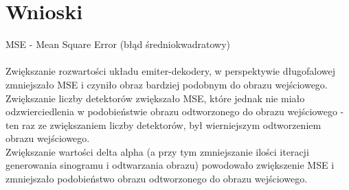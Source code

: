 \documentclass[a4paper,11pt]{article}
\begin{document}
\section{Wnioski}
MSE - Mean Square Error (błąd średniokwadratowy)\\\\
Zwiększanie rozwartości układu emiter-dekodery, w perspektywie długofalowej zmniejszało MSE i czyniło obraz bardziej podobnym do obrazu wejściowego.\\
Zwiększanie liczby detektorów zwiększało MSE, które jednak nie miało odzwierciedlenia w podobieństwie obrazu odtworzonego do obrazu wejściowego - ten raz ze zwiększaniem liczby detektorów, był wierniejszym odtworzeniem obrazu wejściowego.\\
Zwiększanie wartości delta alpha (a przy tym zmniejszanie ilości iteracji generowania sinogramu i odtwarzania obrazu) powodowało zwiększenie MSE i zmniejszało podobieństwo obrazu odtworzonego do obrazu wejściowego.
\end{document}
